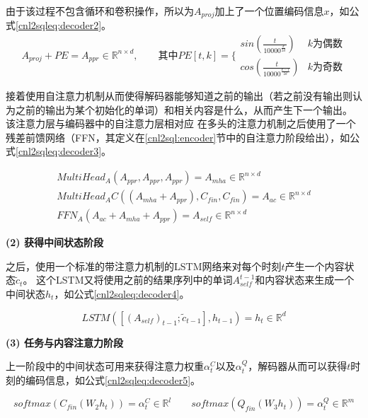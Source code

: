 由于该过程不包含循环和卷积操作，所以为$A_{proj}$加上了一个位置编码信息$x$，如公式\ref{cnl2sqleq:decoder2}。
\begin{equation}
  \label{cnl2sqleq:decoder2}
  A_{proj} + PE = A_{ppr} \in \mathbb{R}^{n \times d},\qquad \mbox{其中} PE[t,k] = \{   
  \begin{array}{lr}
    sin(\frac{t}{10000^{\frac{k}{2d}}}) &  k\mbox{为偶数}\\
    cos(\frac{t}{10000^{\frac{k-1}{2d}}}) &  k\mbox{为奇数}
  \end{array}
\end{equation}

接着使用自注意力机制\cite{vaswani2017attention}从而使得解码器能够知道之前的输出（若之前没有输出则认为之前的输出为某个初始化的单词）和相关内容是什么，从而产生下一个输出。
该注意力层与编码器中的自注意力层相对应
在多头的注意力机制之后使用了一个残差前馈网络（FFN，其定义在\ref{cnl2sql:encoder}节中的自注意力阶段给出），如公式\ref{cnl2sqleq:decoder3}。

\begin{gather}
  \label{cnl2sqleq:decoder3}
  MultiHead_A(A_{ppr},A_{ppr},A_{ppr}) = A_{mha} \in \mathbb{R}^{n \times d}\\
  MultiHead_{A}C((A_{mha} + A_{ppr}),C_{fin},C_{fin}) = A_{ac} \in \mathbb{R}^{n \times d}\\
  FFN_A(A_{ac} + A_{mha} + A_{ppr}) = A_{self} \in \mathbb{R}^{n \times d}
\end{gather}

\textbf{(2) 获得中间状态阶段}

之后，使用一个标准的带注意力机制的LSTM网络来对每个时刻$t$产生一个内容状态$\widetilde{c}_t$。
这个LSTM又将使用之前的结果序列中的单词$A^{t-1}_{self}$和内容状态来生成一个中间状态$h_t$，如公式\ref{cnl2sqleq:decoder4}。

\begin{equation}
  \label{cnl2sqleq:decoder4}
  LSTM([(A_{self})_{t-1};\widetilde{c}_{t-1}],h_{t-1})= h_t \in \mathbb{R}^{d} 
\end{equation}

\textbf{(3) 任务与内容注意力阶段}

上一阶段中的中间状态可用来获得注意力权重$\alpha^C_t$以及$\alpha^Q_t$，解码器从而可以获得$t$时刻的编码信息，如公式\ref{cnl2sqleq:decoder5}。

\begin{equation}
  \label{cnl2sqleq:decoder5}
  softmax(C_{fin}(W_2 h_t)) = \alpha^C_t \in \mathbb{R}^{l} \qquad softmax(Q_{fin}(W_3 h_t)) = \alpha^Q_t \in \mathbb{R}^{m}
\end{equation}

